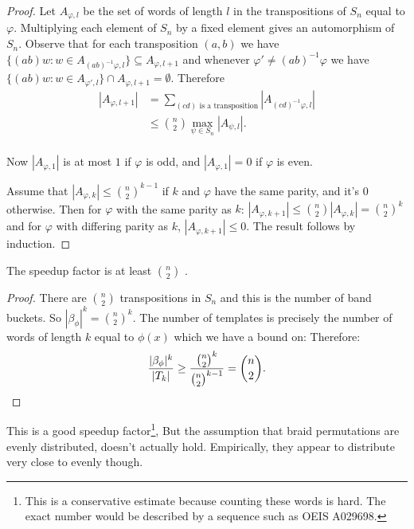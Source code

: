 \documentclass[12pt]{thesis}
\begin{document}
\begin{proof}
    Let $A_{\varphi, l}$ be the set of words of length $l$ in the transpositions of $S_{n}$
    equal to $\varphi$.
    Multiplying each element of $S_{n}$ by a fixed element 
    gives an automorphism of $S_{n}$.
    Observe that for each transposition $(a, b)$
    we have $\{ (ab) w \colon w \in A_{(ab)^{-1} \varphi, l} \} \subseteq A_{\varphi, l+1 }$
    and whenever $\varphi' \neq (ab)^{-1}\varphi$ we have $\{ (ab) w \colon w \in A_{\varphi', l} \} \cap A_{\varphi, l+1} = \emptyset$.
    Therefore
    \[
    \begin{split}
        |A_{\varphi, l+1}| &= \sum_{(cd) \text{ is a transposition}} |A_{(cd)^{-1}\varphi, l}| \\
                              &\leq { n \choose 2 }  \max_{\psi \in S_{n}} |A_{\psi, l}|. \\
    \end{split}
    \]

    Now $|A_{\varphi, 1}|$ is at most $1$ if $\varphi$ is odd,
    and $|A_{\varphi, 1}| = 0$ if $\varphi$ is even. 

    Assume that $|A_{\varphi, k}| \leq { n \choose 2}^{k -1}$
    if $k$ and $\varphi$ have the same parity,
    and it's 0 otherwise.
    Then for $\varphi$ with the same parity as $k$: $|A_{\varphi, k +1}| \leq { n \choose 2} |A_{\varphi, k}| = {n \choose 2}^{k}$
    and for $\varphi$ with differing parity as $k$, $|A_{\varphi, k + 1}| \leq 0$.
    The result follows by induction.
\end{proof}

\begin{theorem}
    The speedup factor is at least ${ n \choose 2 }$ .
\end{theorem}

\begin{proof}
    There are ${ n \choose 2 }$ transpositions in $S_{n}$ and this is the number
    of band buckets.
    So $|\beta_{\phi}|^{k} = {n \choose 2}^{k}$.
    The number of templates is precisely the number of words of length $k$ equal to $\phi(x)$
    which we have a bound on:
    Therefore:
    \[
        \frac{|\beta_{\phi}|^{k}}{|T_{k}|} \geq \frac{ {n \choose 2}^{k} }{ {n \choose 2}^{k-1} } = {n \choose 2}.
        \qedhere
    \]
\end{proof}

This is a good speedup factor\footnote{This is a conservative estimate because counting these words is hard.
              The exact number would be described by a sequence such as OEIS A029698\cite{oeis}.},
But the assumption that braid permutations are evenly distributed,
doesn't actually hold. Empirically, they appear to distribute very close to evenly though.
\end{document}

